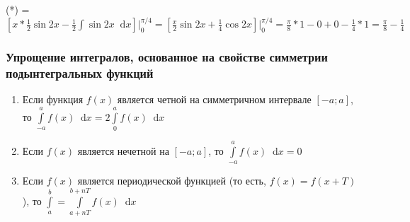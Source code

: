 \documentclass{article}
\newcommand*\diff{\mathop{}\!\mathrm{d}}
\begin{document}
(*) = $[ x * \frac{1}{2} \sin 2 x - \frac{1}{2} \int \sin 2 x \diff x] \bigg|_{0}^{\pi/4} = [\frac{x}{2} \sin 2x + \frac{1}{4} \cos 2x] \bigg|_{0}^{\pi/4} = \frac{\pi}{8} * 1 - 0 + 0 - \frac{1}{4} * 1 = \frac{\pi}{8} - \frac{1}{4}$

\subsubsection{Упрощение интегралов, основанное на свойстве симметрии подынтегральных функций}

\begin{enumerate}
    \item Если функция $f(x)$ является четной на симметричном интервале $[-a; a]$, то $\int\limits_{-a}^{a} f(x) \diff x = 2 \int\limits_{0}^{a} f(x) \diff x$
    \item Если $f(x)$ является нечетной на $[-a; a]$, то $\int\limits_{-a}^{a} f(x) \diff x = 0$
    \item Если $f(x)$ является периодической функцией (то есть, $f(x) = f(x + T)$), то $\int\limits_{a}^{b} = \int\limits_{a + n T}^{b + n T} f(x) \diff x$
\end{enumerate}
\end{document}
